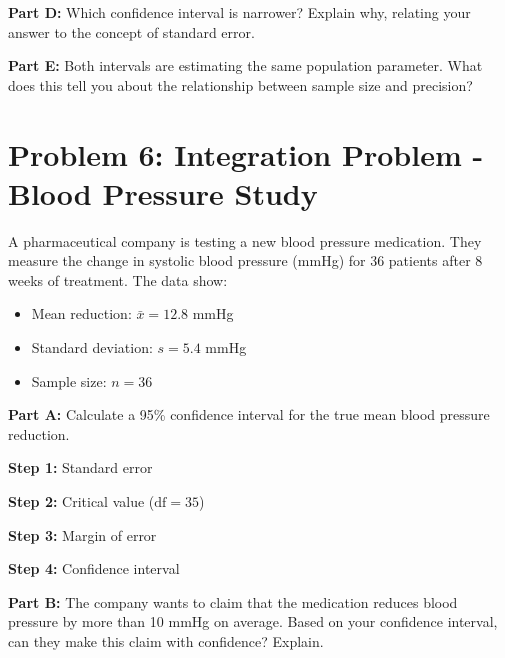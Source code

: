 \documentclass[11pt]{article}
\begin{document}
\textbf{Part D:} Which confidence interval is narrower? Explain why, relating your answer to the concept of standard error.

\vspace{3.5cm}

\textbf{Part E:} Both intervals are estimating the same population parameter. What does this tell you about the relationship between sample size and precision?

\vspace{3cm}

\newpage

\section{Problem 6: Integration Problem - Blood Pressure Study}

A pharmaceutical company is testing a new blood pressure medication. They measure the change in systolic blood pressure (mmHg) for 36 patients after 8 weeks of treatment. The data show:

\begin{itemize}
\item Mean reduction: $\bar{x} = 12.8$ mmHg
\item Standard deviation: $s = 5.4$ mmHg
\item Sample size: $n = 36$
\end{itemize}

\vspace{6pt}

\textbf{Part A:} Calculate a 95\% confidence interval for the true mean blood pressure reduction.

\vspace{0.3cm}

\textbf{Step 1:} Standard error

\vspace{2cm}

\textbf{Step 2:} Critical value ($\text{df} = 35$)

\vspace{1.5cm}

\textbf{Step 3:} Margin of error

\vspace{2cm}

\textbf{Step 4:} Confidence interval

\vspace{2cm}

\textbf{Part B:} The company wants to claim that the medication reduces blood pressure by more than 10 mmHg on average. Based on your confidence interval, can they make this claim with confidence? Explain.
\end{document}

